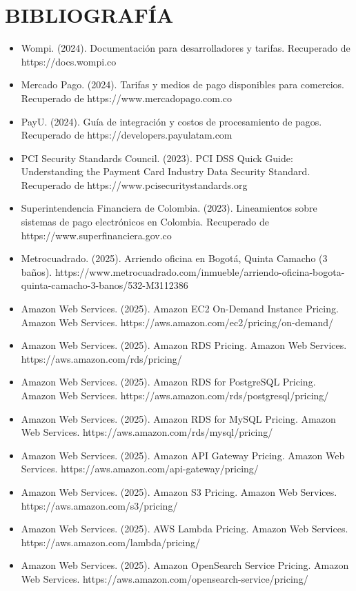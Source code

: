 \documentclass[12pt,a4paper]{article}
\newcommand{\sectiontitle}[1]{\section{#1}}
\begin{document}
\sectiontitle{BIBLIOGRAFÍA}

\begin{itemize}
    \item Wompi. (2024). Documentación para desarrolladores y tarifas. Recuperado de https://docs.wompi.co
    \item Mercado Pago. (2024). Tarifas y medios de pago disponibles para comercios. Recuperado de https://www.mercadopago.com.co
    \item PayU. (2024). Guía de integración y costos de procesamiento de pagos. Recuperado de https://developers.payulatam.com
    \item PCI Security Standards Council. (2023). PCI DSS Quick Guide: Understanding the Payment Card Industry Data Security Standard. Recuperado de https://www.pcisecuritystandards.org
    \item Superintendencia Financiera de Colombia. (2023). Lineamientos sobre sistemas de pago electrónicos en Colombia. Recuperado de https://www.superfinanciera.gov.co
    \item Metrocuadrado. (2025). Arriendo oficina en Bogotá, Quinta Camacho (3 baños). https://www.metrocuadrado.com/inmueble/arriendo-oficina-bogota-quinta-camacho-3-banos/532-M3112386
    \item Amazon Web Services. (2025). Amazon EC2 On-Demand Instance Pricing. Amazon Web Services. https://aws.amazon.com/ec2/pricing/on-demand/
    \item Amazon Web Services. (2025). Amazon RDS Pricing. Amazon Web Services. https://aws.amazon.com/rds/pricing/
    \item Amazon Web Services. (2025). Amazon RDS for PostgreSQL Pricing. Amazon Web Services. https://aws.amazon.com/rds/postgresql/pricing/
    \item Amazon Web Services. (2025). Amazon RDS for MySQL Pricing. Amazon Web Services. https://aws.amazon.com/rds/mysql/pricing/
    \item Amazon Web Services. (2025). Amazon API Gateway Pricing. Amazon Web Services. https://aws.amazon.com/api-gateway/pricing/
    \item Amazon Web Services. (2025). Amazon S3 Pricing. Amazon Web Services. https://aws.amazon.com/s3/pricing/
    \item Amazon Web Services. (2025). AWS Lambda Pricing. Amazon Web Services. https://aws.amazon.com/lambda/pricing/
    \item Amazon Web Services. (2025). Amazon OpenSearch Service Pricing. Amazon Web Services. https://aws.amazon.com/opensearch-service/pricing/

\end{itemize}
\end{document}
